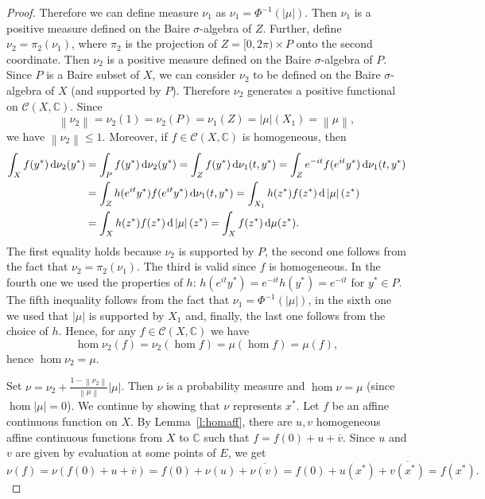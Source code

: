 \documentclass{amsart}
\numberwithin{equation}{section}
\theoremstyle{definition}
\def\C{\mathcal C}
\def\ce{\mathbb C}
\def\ov{\overline}
\def\hom{\operatorname{hom}}
\def\di{\,\mbox{\rm d}}
\newcommand{\norm}[1]{\left\|#1\right\|}
\newcommand{\abs}[1]{\left| #1  \right|}
\begin{document}
\begin{proof}
Therefore we can define measure $\nu_1$ as $\nu_1=\Phi^{-1}(\abs{\mu})$. Then $\nu_1$ is a positive measure defined on the Baire $\sigma$-algebra of $Z$. Further, define $\nu_2=\pi_2(\nu_1)$, where $\pi_2$ is the projection of $Z=[0,2\pi)\times P$ onto the second coordinate. Then $\nu_2$ is a positive measure defined on the Baire $\sigma$-algebra of $P$. Since $P$ is a Baire subset of $X$, we can consider $\nu_2$ to be defined on the Baire $\sigma$-algebra of $X$ (and supported by $P$). Therefore $\nu_2$ generates a positive functional on $\C(X,\ce)$. Since
$$\norm{\nu_2}=\nu_2(1)=\nu_2(P)=\nu_1(Z)=\abs{\mu}(X_1)=\norm{\mu},$$
we have $\norm{\nu_2}\le 1$. Moreover, if $f\in\C(X,\ce)$ is homogeneous, then
$$\begin{aligned}
\int_X f(y^*)\di\nu_2(y^*)&=\int_P f(y^*)\di\nu_2(y^*)
=\int_Z f(y^*)\di\nu_1(t,y^*)
=\int_Z e^{-it}f(e^{it}y^*)\di\nu_1(t,y^*)
\\&=\int_Z h(e^{it}y^*) f(e^{it}y^*)\di\nu_1(t,y^*)
=\int_{X_1} h(z^*)f(z^*)\di\abs{\mu}(z^*)
\\&=\int_{X} h(z^*)f(z^*)\di\abs{\mu}(z^*)
=\int_{X}f(z^*)\di{\mu}(z^*).
\end{aligned}$$
The first equality holds because $\nu_2$ is supported by $P$, the second one follows from the fact that $\nu_2=\pi_2(\nu_1)$. The third is valid since $f$ is homogeneous. In the fourth one we used the properties of $h$: $h(e^{it}y^*)=e^{-it}h(y^*)=e^{-it}$ for $y^*\in P$. The fifth inequality follows from the fact that $\nu_1=\Phi^{-1}(\abs{\mu})$, in the sixth one we used that $\abs{\mu}$ is supported by $X_1$ and, finally, the last one follows from the choice of $h$. Hence, for any $f\in\C(X,\ce)$ we have
$$\hom\nu_2(f)=\nu_2(\hom f)=\mu(\hom f)=\mu(f),$$
hence $\hom\nu_2=\mu$.

Set $\nu=\nu_2+ \frac{1-\norm{\nu_2}}{\norm{\mu}}\abs{\mu}$. Then $\nu$ is a probability measure and $\hom\nu=\mu$ (since $\hom\abs{\mu}=0$).
We continue by showing that $\nu$ represents $x^*$. Let $f$ be an affine continuous function on $X$. By Lemma~\ref{l:homaff}, there are $u,v$ homogeneous affine continuous functions from $X$ to $\ce$ such that $f=f(0)+u+\ov{v}$. Since $u$ and $v$ are given by evaluation at some points of $E$, we get
$$\nu(f)=\nu(f(0)+u+\ov{v})=f(0)+\nu(u)+\ov{\nu(v)}=f(0)+u(x^*)+\ov{v(x^*)}=f(x^*).$$


\end{proof}
\end{document}
